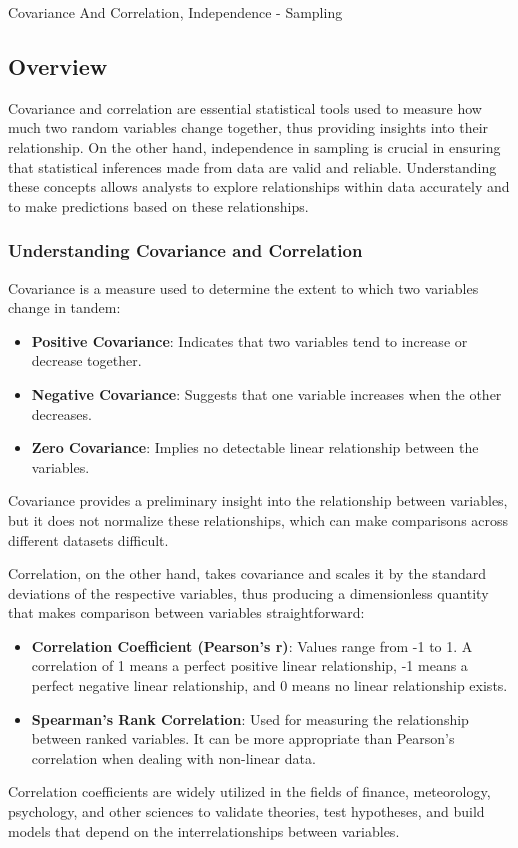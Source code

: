 \begin{notes}{Covariance And Correlation, Independence - Sampling}
    \subsection*{Overview}

    Covariance and correlation are essential statistical tools used to measure how much two random variables change together, thus providing insights into their relationship. On the other hand, 
    independence in sampling is crucial in ensuring that statistical inferences made from data are valid and reliable. Understanding these concepts allows analysts to explore relationships within 
    data accurately and to make predictions based on these relationships. \vspace*{1em}
    
    \subsubsection*{Understanding Covariance and Correlation}
    
    Covariance is a measure used to determine the extent to which two variables change in tandem:
    \begin{itemize}
        \item \textbf{Positive Covariance}: Indicates that two variables tend to increase or decrease together.
        \item \textbf{Negative Covariance}: Suggests that one variable increases when the other decreases.
        \item \textbf{Zero Covariance}: Implies no detectable linear relationship between the variables.
    \end{itemize}
    Covariance provides a preliminary insight into the relationship between variables, but it does not normalize these relationships, which can make comparisons across different datasets difficult.
    
    Correlation, on the other hand, takes covariance and scales it by the standard deviations of the respective variables, thus producing a dimensionless quantity that makes comparison between variables straightforward:
    \begin{itemize}
        \item \textbf{Correlation Coefficient (Pearson's r)}: Values range from -1 to 1. A correlation of 1 means a perfect positive linear relationship, -1 means a perfect negative linear relationship, 
        and 0 means no linear relationship exists.
        \item \textbf{Spearman's Rank Correlation}: Used for measuring the relationship between ranked variables. It can be more appropriate than Pearson's correlation when dealing with non-linear data.
    \end{itemize}
    Correlation coefficients are widely utilized in the fields of finance, meteorology, psychology, and other sciences to validate theories, test hypotheses, and build models that depend on the interrelationships between variables.
    

\end{notes}
